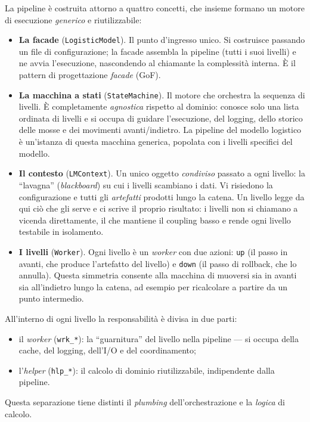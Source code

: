 La pipeline è costruita attorno a quattro concetti, che insieme formano un
motore di esecuzione \emph{generico} e riutilizzabile:

\begin{itemize}
  \item \textbf{La facade} (\texttt{LogisticModel}). Il punto d'ingresso unico.
    Si costruisce passando un file di configurazione; la facade assembla la
    pipeline (tutti i suoi livelli) e ne avvia l'esecuzione, nascondendo al
    chiamante la complessità interna. È il pattern di progettazione
    \emph{facade} (GoF).

  \item \textbf{La macchina a stati} (\texttt{StateMachine}). Il motore che
    orchestra la sequenza di livelli. È completamente \emph{agnostica} rispetto
    al dominio: conosce solo una lista ordinata di livelli e si occupa di guidare
    l'esecuzione, del logging, dello storico delle mosse e dei movimenti
    avanti/indietro. La pipeline del modello logistico è un'istanza di questa
    macchina generica, popolata con i livelli specifici del modello.

  \item \textbf{Il contesto} (\texttt{LMContext}). Un unico oggetto
    \emph{condiviso} passato a ogni livello: la ``lavagna'' (\emph{blackboard})
    su cui i livelli scambiano i dati. Vi risiedono la configurazione e tutti gli
    \emph{artefatti} prodotti lungo la catena. Un livello legge da qui ciò che
    gli serve e ci scrive il proprio risultato: i livelli non si chiamano a
    vicenda direttamente, il che mantiene il coupling basso e rende ogni livello
    testabile in isolamento.

  \item \textbf{I livelli} (\texttt{Worker}). Ogni livello è un \emph{worker}
    con due azioni: \texttt{up} (il passo in avanti, che produce l'artefatto del
    livello) e \texttt{down} (il passo di rollback, che lo annulla). Questa
    simmetria consente alla macchina di muoversi sia in avanti sia all'indietro
    lungo la catena, ad esempio per ricalcolare a partire da un punto intermedio.
\end{itemize}

All'interno di ogni livello la responsabilità è divisa in due parti:
\begin{itemize}
  \item il \emph{worker} (\texttt{wrk\_*}): la ``guarnitura'' del livello nella
    pipeline — si occupa della cache, del logging, dell'I/O e del coordinamento;
  \item l'\emph{helper} (\texttt{hlp\_*}): il calcolo di dominio riutilizzabile,
    indipendente dalla pipeline.
\end{itemize}
Questa separazione tiene distinti il \emph{plumbing} dell'orchestrazione e la
\emph{logica} di calcolo.

